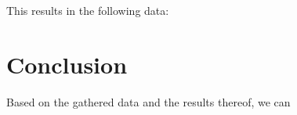 This results in the following data:

\section{Conclusion}
Based on the gathered data and the results thereof, we can 
